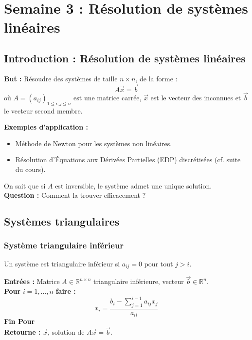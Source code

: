 \section{Semaine 3 : Résolution de systèmes linéaires}

\subsection{Introduction : Résolution de systèmes linéaires}

\textbf{But :} Résoudre des systèmes de taille $n \times n$, de la forme :
\[ A\vec{x} = \vec{b} \]
où $A = (a_{ij})_{1 \le i,j \le n}$ est une matrice carrée, $\vec{x}$ est le vecteur des inconnues et $\vec{b}$ le vecteur second membre.

\textbf{Exemples d'application :}
\begin{itemize}
    \item Méthode de Newton pour les systèmes non linéaires.
    \item Résolution d'Équations aux Dérivées Partielles (EDP) discrétisées (cf. suite du cours).
\end{itemize}

On sait que si $A$ est inversible, le système admet une unique solution. \\
\textbf{Question :} Comment la trouver efficacement ?

\subsection{Systèmes triangulaires}

\subsubsection{Système triangulaire inférieur}
Un système est triangulaire inférieur si $a_{ij} = 0$ pour tout $j > i$.

\begin{algorithme}
\textbf{Entrées :} Matrice $A \in \mathbb{R}^{n \times n}$ triangulaire inférieure, vecteur $\vec{b} \in \mathbb{R}^n$. \\
\textbf{Pour} $i = 1, \dots, n$ \textbf{faire :}
\[ x_i = \frac{b_i - \sum_{j=1}^{i-1} a_{ij}x_j}{a_{ii}} \]
\textbf{Fin Pour} \\
\textbf{Retourne :} $\vec{x}$, solution de $A\vec{x} = \vec{b}$.
\end{algorithme}

